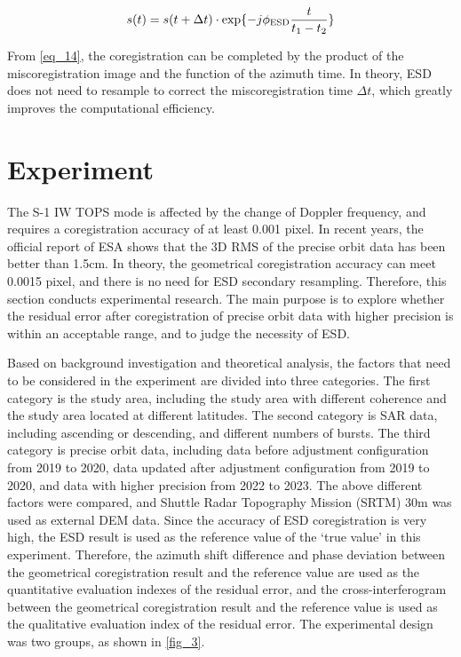 \documentclass[a4paper,fleqn]{cas-sc}
\begin{document}
\begin{equation}
    s(t) = s(t + \Delta t) \cdot {\rm exp} \{-j \phi_{\rm ESD} \frac{t}{t_1 - t_2}\}
    \label{eq_14}
\end{equation}

\noindent From \ref{eq_14}, the coregistration can be completed by the product of the miscoregistration image and the function of the azimuth time. In theory, ESD does not need to resample to correct the miscoregistration time $\Delta t$, which greatly improves the computational efficiency. \par


\section{Experiment}

The S-1 IW TOPS mode is affected by the change of Doppler frequency, and requires a coregistration accuracy of at least 0.001 pixel. In recent years, the official report of ESA shows that the 3D RMS of the precise orbit data has been better than 1.5cm. In theory, the geometrical coregistration accuracy can meet 0.0015 pixel, and there is no need for ESD secondary resampling. Therefore, this section conducts experimental research. The main purpose is to explore whether the residual error after coregistration of precise orbit data with higher precision is within an acceptable range, and to judge the necessity of ESD. \par

Based on background investigation and theoretical analysis, the factors that need to be considered in the experiment are divided into three categories. The first category is the study area, including the study area with different coherence and the study area located at different latitudes. The second category is SAR data, including ascending or descending, and different numbers of bursts. The third category is precise orbit data, including data before adjustment configuration from 2019 to 2020, data updated after adjustment configuration from 2019 to 2020, and data with higher precision from 2022 to 2023. The above different factors were compared, and Shuttle Radar Topography Mission (SRTM) 30m was used as external DEM data. Since the accuracy of ESD coregistration is very high, the ESD result is used as the reference value of the ‘true value’ in this experiment. Therefore, the azimuth shift difference and phase deviation between the geometrical coregistration result and the reference value are used as the quantitative evaluation indexes of the residual error, and the cross-interferogram between the geometrical coregistration result and the reference value is used as the qualitative evaluation index of the residual error. The experimental design was two groups, as shown in \ref{fig_3}. \par
\end{document}

